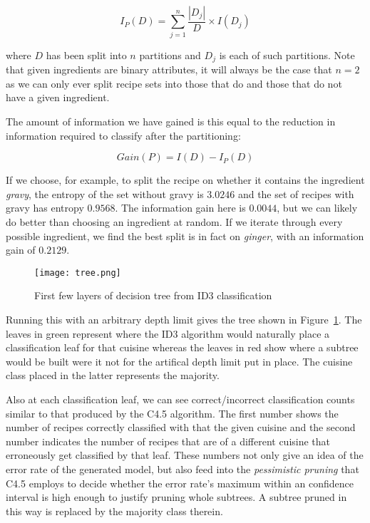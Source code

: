 \documentclass[11pt,a4paper]{article}
\begin{document}
\begin{equation}
  I_P(D) = \sum_{j=1}^n\frac{|D_j|}{D} \times I(D_j)
\end{equation}

\noindent where $D$ has been split into $n$ partitions and $D_j$ is each of such
partitions. Note that given ingredients are binary attributes, it will
always be the case that $n = 2$ as we can only ever split recipe sets into
those that do and those that do not have a given ingredient.

The amount of information we have gained is this equal to the reduction in
information required to classify after the partitioning:

\begin{equation}
  Gain(P) = I(D) - I_P(D)
\end{equation}

If we choose, for example, to split the recipe on whether it contains the
ingredient \emph{gravy}, the entropy of the set without gravy is $3.0246$
and the set of recipes with gravy has entropy $0.9568$. The information
gain here is $0.0044$, but we can likely do better than choosing an
ingredient at random. If we iterate through every possible ingredient, we
find the best split is in fact on \emph{ginger}, with an information gain
of $0.2129$.

\begin{figure}[t]
  \begin{center}
    \texttt{[image: tree.png]}
  \end{center}
  \caption{First few layers of decision tree from ID3 classification\label{stub-decision-tree}}
\end{figure}

Running this with an arbitrary depth limit gives the tree shown in
Figure~\ref{stub-decision-tree}. The leaves in green represent where
the ID3 algorithm would naturally place a classification leaf for that
cuisine whereas the leaves in red show where a subtree would be built
were it not for the artifical depth limit put in place. The cuisine
class placed in the latter represents the majority.

Also at each classification leaf, we can
see correct/incorrect classification counts similar to that produced
by the C4.5 algorithm. The first number shows the number of recipes
correctly classified with that the given cuisine and the second number
indicates the number of recipes that are of a different cuisine that
erroneously get classified by that leaf. These numbers not only give
an idea of the error rate of the generated model, but also feed into the
\emph{pessimistic pruning} \cite{quinlan1993c4} that C4.5 employs
to decide whether the error rate's maximum within an confidence interval is
high enough to justify pruning whole subtrees. A subtree pruned in this
way is replaced by the majority class therein.
\end{document}
